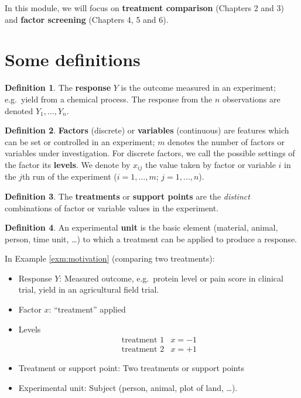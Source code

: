 \documentclass[
]{book}
\providecommand{\tightlist}{%
  \setlength{\itemsep}{0pt}\setlength{\parskip}{0pt}}
\theoremstyle{definition}
\newtheorem{definition}{Definition}[chapter]
\theoremstyle{definition}
\theoremstyle{definition}
\theoremstyle{definition}
\theoremstyle{remark}
\begin{document}
In this module, we will focus on \textbf{treatment comparison} (Chapters 2 and 3) and \textbf{factor screening} (Chapters 4, 5 and 6).

\hypertarget{some-definitions}{%
\section{Some definitions}\label{some-definitions}}

\begin{definition}
\protect\hypertarget{def:response}{}\label{def:response}The \textbf{response} \(Y\) is the outcome measured in an experiment; e.g.~yield from a chemical process. The response from the \(n\) observations are denoted \(Y_{1},\dots,Y_{n}\).
\end{definition}

\begin{definition}
\protect\hypertarget{def:factor-variable}{}\label{def:factor-variable}\textbf{Factors} (discrete) or \textbf{variables} (continuous) are features which can be set or controlled in an experiment; \(m\) denotes the number of factors or variables under investigation. For discrete factors, we call the possible settings of the factor its \textbf{levels}. We denote by \(x_{ij}\) the value taken by factor or variable \(i\) in the \(j\)th run of the experiment (\(i = 1, \ldots, m\); \(j = 1, \ldots, n\)).
\end{definition}

\begin{definition}
\protect\hypertarget{def:treatment}{}\label{def:treatment}The \textbf{treatments} or \textbf{support points} are the \emph{distinct} combinations of factor or variable values in the experiment.
\end{definition}

\begin{definition}
\protect\hypertarget{def:unit}{}\label{def:unit}An experimental \textbf{unit} is the basic element (material, animal, person, time unit, \ldots) to which a treatment can be applied to produce a response.
\end{definition}

In Example \ref{exm:motivation} (comparing two treatments):

\begin{itemize}
\tightlist
\item
  Response \(Y\): Measured outcome, e.g.~protein level or pain score in clinical trial, yield in an agricultural field trial.
\item
  Factor \(x\): ``treatment'' applied
\item
  Levels
  \[
  \begin{array}{ll}
  \textrm{treatment 1}&x =-1\\
  \textrm{treatment 2}&x =+1
  \end{array}
  \]
\item
  Treatment or support point: Two treatments or support points
\item
  Experimental unit: Subject (person, animal, plot of land, \ldots).
\end{itemize}
\end{document}
